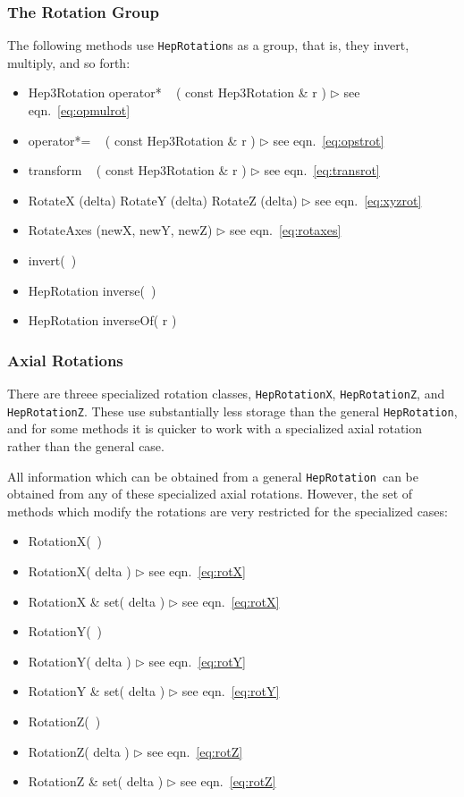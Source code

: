 \documentclass[twoside,12pt]{article}
\def \Ro {{\tt HepRotation}}
\newcommand {\see}[1] {\hfill$\triangleright$ see eqn.~#1}
\newenvironment{shortlist}{%
\begin{itemize}
\setlength{\itemsep}{0pt}
\setlength{\parskip}{0pt}
}{%
\end{itemize}
}
\begin{document}
\subsubsection{The Rotation Group}

The following methods use \Ro s as a group, that is, they invert, multiply, 
and so forth:

\begin{shortlist}
  \item Hep3Rotation operator* ~ ( const Hep3Rotation \& r ) 
		\see{\ref{eq:opmulrot}}
  \item operator*= ~ ( const Hep3Rotation \& r ) 
		\see{\ref{eq:opstrot}}
  \item transform ~ ( const Hep3Rotation \& r ) 
		\see{\ref{eq:transrot}}
  \item RotateX (delta) \/\/\/ RotateY (delta) \/\/\/ RotateZ (delta) 
		\see{\ref{eq:xyzrot}}
  \item RotateAxes (newX, newY, newZ) 
		\see{\ref{eq:rotaxes}}

  \item invert(~)
  \item HepRotation inverse(~)
  \item HepRotation inverseOf( r )


\end{shortlist}

\subsubsection{Axial Rotations}

There are threee specialized rotation classes, {\tt HepRotationX}, 
{\tt HepRotationZ}, and {\tt HepRotationZ}.
These use substantially less storage than the general \Ro, 
and for some methods it is quicker to work with a specialized axial rotation
rather than the general case.

All information which can be obtained from a general \Ro\ can be obtained 
from any of these specialized axial rotations.  
However, the set of methods which modify the rotations are very restricted
for the specialized cases:
\begin{shortlist}
  \item RotationX(~)
  \item RotationX( delta )		\see{\ref{eq:rotX}}
  \item RotationX \& set( delta )	\see{\ref{eq:rotX}}
  \item RotationY(~)
  \item RotationY( delta )		\see{\ref{eq:rotY}}
  \item RotationY \& set( delta )	\see{\ref{eq:rotY}}
  \item RotationZ(~)
  \item RotationZ( delta )		\see{\ref{eq:rotZ}}
  \item RotationZ \& set( delta )	\see{\ref{eq:rotZ}}
\end{shortlist}
\end{document}

